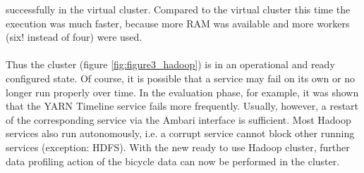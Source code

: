 successfully in the virtual cluster. Compared to the virtual cluster this time the execution was much
faster, because more RAM was available and more workers (six! instead of four) were used.\\\\
Thus the cluster (figure \ref{fig:figure3_hadoop}) is in an operational and ready configured state. Of course, it is possible
that a service may fail on its own or no longer run properly over time. In the evaluation phase, for
example, it was shown that the YARN Timeline service fails more frequently. Usually, however, a
restart of the corresponding service via the Ambari interface is sufficient. Most Hadoop services also run autonomously, i.e. a corrupt service cannot block other running services (exception: HDFS). With the new ready to use Hadoop cluster, further data profiling action of the bicycle data can now be performed in the cluster.
